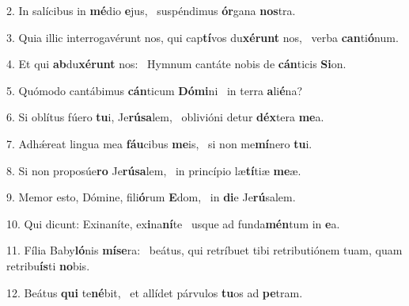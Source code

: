 2. In salícibus in \textbf{mé}dio \textbf{e}jus, \ast\  suspéndimus \textbf{ór}gana \textbf{nos}tra.\

3. Quia illic interrogavérunt nos, qui cap\textbf{tí}vos du\textbf{xé}\textbf{runt} nos, \ast\  verba \textbf{can}ti\textbf{ó}num.\

4. Et qui \textbf{ab}du\textbf{xé}\textbf{runt} nos: \ast\  Hymnum cantáte nobis de \textbf{cán}ticis \textbf{Si}on.\

5. Quómodo cantábimus \textbf{cán}ticum \textbf{Dó}\textbf{mi}ni \ast\  in terra \textbf{a}li\textbf{é}na?\

6. Si oblítus fúero \textbf{tu}i, Je\textbf{rú}\textbf{sa}lem, \ast\  oblivióni detur \textbf{déx}tera \textbf{me}a.\

7. Adhǽreat lingua mea \textbf{fáu}cibus \textbf{me}is, \ast\  si non me\textbf{mí}nero \textbf{tu}i.\

8. Si non proposúe\textbf{ro} Je\textbf{rú}\textbf{sa}lem, \ast\  in princípio læ\textbf{tí}tiæ \textbf{me}æ.\

9. Memor esto, Dómine, fili\textbf{ó}rum \textbf{E}dom, \ast\  in \textbf{di}e Je\textbf{rú}salem.\

10. Qui dicunt: Exinaníte, ex\textbf{i}na\textbf{ní}te \ast\  usque ad funda\textbf{mén}tum in \textbf{e}a.\

11. Fília Baby\textbf{ló}nis \textbf{mí}\textbf{se}ra: \ast\  beátus, qui retríbuet tibi retributiónem tuam, quam retribu\textbf{ís}ti \textbf{no}bis.\

12. Beátus \textbf{qui} te\textbf{né}bit, \ast\  et allídet párvulos \textbf{tu}os ad \textbf{pe}tram.\


